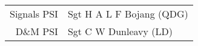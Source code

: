 \vspace*{5mm}

\begin{center}
  \small
  \begin{tabular}{rl}
    Signals PSI & Sgt H A L F Bojang (QDG) \\
    D\&M PSI & Sgt C W Dunleavy (LD) \\
  \end{tabular}
\end{center}
